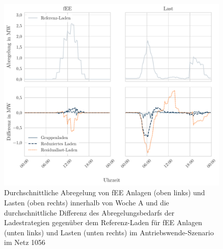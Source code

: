 \begin{figure}[H]
    \centering
    \includegraphics[width=\textwidth]{Bilder/1056_fEE_load_diff}
    \caption{Durchschnittliche Abregelung von fEE Anlagen (oben links) und Lasten (oben rechts) innerhalb von Woche A und die durchschnittliche Differenz des Abregelungsbedarfs der Ladestrategien gegenüber dem Referenz-Laden für fEE Anlagen (unten links) und Lasten (unten rechts) im Antriebswende-Szenario im Netz \num{1056}}\label{fig:1056_fEE_load_diff}
\end{figure}